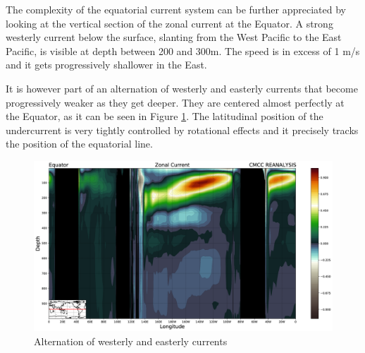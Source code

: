 The complexity of the equatorial current system can be further
appreciated by looking at the vertical section of the zonal current at
the Equator. A strong westerly current below the
surface, slanting from the West Pacific to the East Pacific, is visible
at depth between 200 and 300m. The speed is in excess of 1 m/s and it
gets progressively shallower in the East.

It is however part of an alternation of westerly and easterly currents
that become progressively weaker as they get deeper. They are centered
almost perfectly at the Equator, as it can be seen in Figure \ref{fig:fig16}. The latitudinal position of the undercurrent is very tightly controlled by rotational effects and it precisely tracks the position of the equatorial line.

\begin{figure}[htpb]
\centering
\includegraphics[width = 0.4 \textwidth]{uploads/40image.png}
\caption{Alternation of westerly and easterly currents} \label{fig:fig16}
\end{figure}

